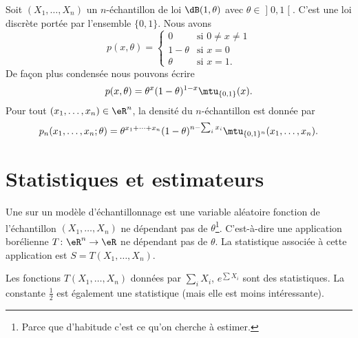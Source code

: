 \begin{example}
	Soit \( (X_1,\ldots,X_n)\) un \( n\)-échantillon de loi \( \dB(1,\theta)\) avec \( \theta\in\mathopen] 0 , 1 \mathclose[\). C'est une loi discrète portée par l'ensemble \( \{ 0,1 \}\). Nous avons
	\begin{equation}
		p(x,\theta)=\begin{cases}
			0        & \text{si } 0\neq x\neq 1 \\
			1-\theta & \text{si } x=0           \\
			\theta   & \text{si } x=1\text{.}
		\end{cases}
	\end{equation}
	De façon plus condensée nous pouvons écrire
	\begin{equation}
		p(x,\theta)=\theta^x(1-\theta)^{1-x}\mtu_{\{ 0,1 \}}(x).
	\end{equation}
	Pour tout \( (x_1,\ldots,x_n)\in\eR^n\), la densité du \( n\)-échantillon est donnée par
	\begin{equation}
		p_n(x_1,\ldots,x_n;\theta)=\theta^{x_1+\cdots+x_n}(1-\theta)^{n-\sum_ix_i}\mtu_{\{ 0,1 \}^n}(x_1,\ldots,x_n).
	\end{equation}
\end{example}

\section{Statistiques et estimateurs}

\begin{definition}
	Une  sur un modèle d'échantillonnage est une variable aléatoire fonction de l'échantillon \( (X_1,\ldots,X_n)\) ne dépendant pas de \( \theta\)\footnote{Parce que d'habitude c'est ce qu'on cherche à estimer.}. C'est-à-dire une application borélienne \( T\colon \eR^n\to \eR\) ne dépendant pas de \( \theta\). La statistique associée à cette application est \( S=T(X_1,\ldots,X_n)\).
\end{definition}

Les fonctions \( T(X_1,\ldots,X_n)\) données par \( \sum_iX_i\), \(  e^{\sum X_i}\) sont des statistiques. La constante \( \frac{ 1 }{2}\) est également une statistique (mais elle est moins intéressante).

